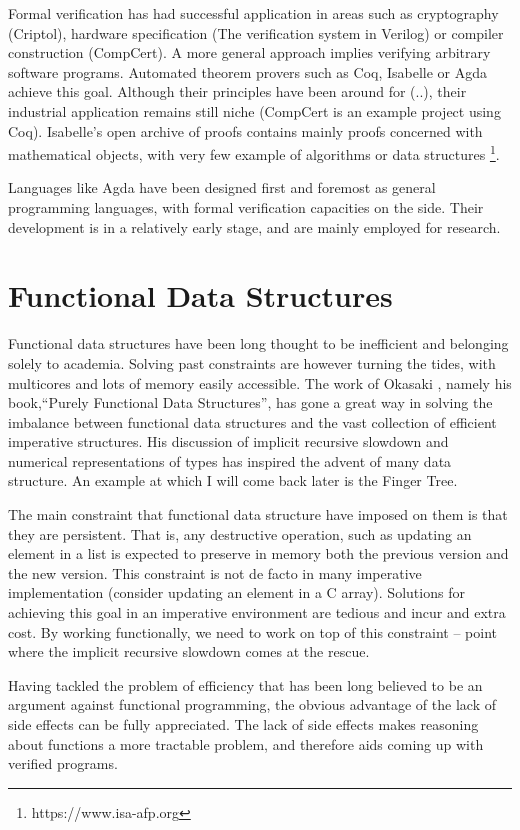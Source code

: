 \documentclass[12pt,twoside,notitlepage]{report}
\begin{document}
Formal verification has had successful application in areas such as  cryptography (Criptol), hardware specification (The verification system in Verilog) or compiler construction (CompCert). 
A more general approach implies verifying arbitrary software programs. Automated theorem provers such as Coq, Isabelle or Agda achieve this goal. Although their principles have been around for (..), their industrial application remains still niche (CompCert is an example project using Coq). Isabelle’s open archive of proofs contains mainly proofs concerned with mathematical objects, with very few example of algorithms or data structures \footnote{https://www.isa-afp.org}. 
	
Languages like Agda have been designed first and foremost as general programming languages, with formal verification capacities on the side. Their development is in a relatively early stage, and are mainly employed for research. 

\section{Functional Data Structures}

Functional data structures have been long thought to be inefficient and belonging solely to academia. Solving past constraints are however turning the tides, with multicores and lots of memory easily accessible. The work of Okasaki \cite{okasaki}, namely his book,“Purely Functional Data Structures”, has gone a great way in solving the imbalance between functional data structures and the vast collection of efficient imperative structures. His discussion of implicit recursive slowdown and numerical representations of types has inspired the advent of many data structure. An example at which I will come back later is the Finger Tree.

The main constraint that functional data structure have imposed on them is that they are persistent. That is, any destructive operation, such as updating an element in a list is expected to preserve in memory both the previous version and the new version. This constraint is not de facto in many imperative implementation (consider updating an element in a C array). Solutions for achieving this goal in an imperative environment are tedious and incur and extra cost. By working functionally, we need to work on top of this constraint – point where the implicit recursive slowdown comes at the rescue.

Having tackled the problem of efficiency that has been long believed to be an argument against functional programming, the obvious advantage of the lack of side effects can be fully appreciated. The lack of side effects makes reasoning about functions a more tractable problem, and therefore aids coming up with verified programs.
\end{document}
